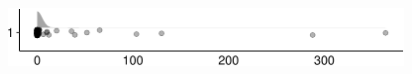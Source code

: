 \documentclass[
]{article}
\begin{document}
\begin{minipage}[t]{0.3\linewidth}

~

\end{minipage}%
\begin{minipage}[t]{0.7\linewidth}

\includegraphics[width=396px]{codebook_template_files/figure-latex/q7_35_rainplot-1}

\end{minipage}
 \vspace*{-5mm} 

\begin{minipage}[t]{0.3\linewidth}

~

\end{minipage}%
\begin{minipage}[t]{0.7\linewidth}

~

\end{minipage}
 \vspace*{-7mm} 
\end{document}
